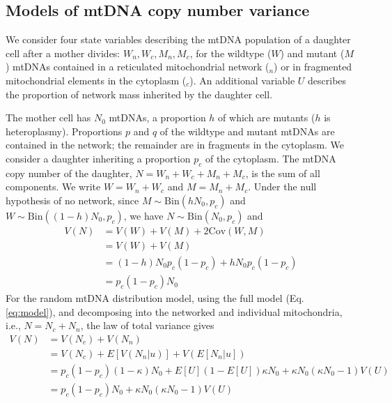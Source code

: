 \documentclass{article}
\begin{document}
\begin{appendices}
\section{Models of mtDNA copy number variance}
 We consider four state variables describing the mtDNA population of a daughter cell after a mother divides: $W_n, W_c, M_n, M_c$, for the wildtype ($W$) and mutant ($M$) mtDNAs contained in a reticulated mitochondrial network (${}_n$) or in fragmented mitochondrial elements in the cytoplasm (${}_c$). An additional variable $U$ describes the proportion of network mass inherited by the daughter cell.

The mother cell has $N_0$ mtDNAs, a proportion $h$ of which are mutants ($h$ is heteroplasmy). Proportions $p$ and $q$ of the wildtype and mutant mtDNAs are contained in the network; the remainder are in fragments in the cytoplasm. 
We consider a daughter inheriting a proportion $p_c$ of the cytoplasm. The mtDNA copy number of the daughter, $N = W_n+W_c+M_n+M_c$, is the sum of all components. We write $W = W_n + W_c$ and $M = M_n+M_c$. Under the null hypothesis of no network, since $M\sim \mathrm{Bin}(hN_0,p_c)$ and $W\sim\mathrm{Bin}((1-h)N_0,p_c)$, we have $N \sim \mathrm{Bin}(N_0, p_c)$ and 
\begin{equation}\label{eq:app-vn-null}
    \begin{split}
    V(N)&=V(W)+V(M)+2\mathrm{Cov}(W,M)\\
        &=V(W)+V(M)\\
        &=(1-h)N_0p_c(1-p_c)+hN_0p_c(1-p_c)\\
        &=p_c(1-p_c)N_0
    \end{split}
\end{equation}
For the random mtDNA distribution model, using the full model (Eq. \ref{eq:model}), and decomposing into the networked and individual mitochondria, i.e., $N=N_c+N_n$, the law of total variance gives
\begin{equation}\label{eq:app-vn-net}
    \begin{split}
    V(N)&=V(N_c)+V(N_n)\\
         &=V(N_c)+E[V(N_n|u)]+V(E[N_n|u])\\
         &= p_c(1-p_c)(1-\kappa)N_0
          + E[U](1-E[U])\kappa N_0+\kappa N_0(\kappa N_0-1)V(U)\\
         &=p_c(1-p_c)N_0+\kappa N_0(\kappa N_0-1)V(U)
    \end{split}
\end{equation}

\end{appendices}
\end{document}
